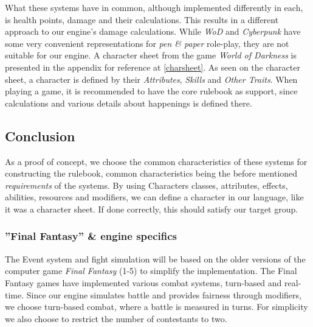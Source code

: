 What these systems have in common, although implemented differently in each, is health points, damage and their calculations. This results in a different approach to our engine's damage calculations. While \emph{WoD} and \emph{Cyberpunk} have some very convenient representations for \emph{pen \& paper} role-play, they are not suitable for our engine. A character sheet from the game \emph{World of Darkness} is presented in the appendix for reference at \vref{charsheet}. As seen on the character sheet, a character is defined by their \emph{Attributes}, \emph{Skills} and \emph{Other Traits}. When playing a game, it is recommended to have the core rulebook as support, since calculations and various details about happenings is defined there.
\subsection*{Conclusion}
As a proof of concept, we choose the common characteristics of these systems for constructing the rulebook, common characteristics being the before mentioned \emph{requirements} of the systems.
By using Characters classes, attributes, effects, abilities, resources and modifiers, we can define a character in our language, like it was a character sheet. If done correctly, this should satisfy our target group.

\subsubsection*{''Final Fantasy'' \& engine specifics}
The Event system and fight simulation will be based on the older versions of the computer game \emph{Final Fantasy} (1-5) to simplify the implementation.
The Final Fantasy games have implemented various combat systems, turn-based and real-time.\cite{ffantasy}
Since our engine simulates battle and provides fairness through modifiers, we choose turn-based combat, where a battle is measured in turns.
For simplicity we also choose to restrict the number of contestants to two.



